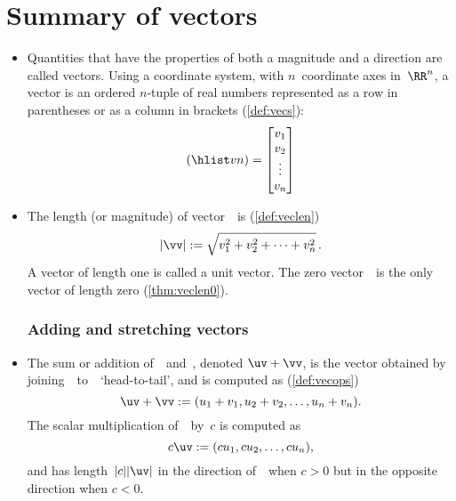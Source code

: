 
\section{Summary of vectors}
\label{sec:sumv}


\begin{itemize}
\def\index#1{}%

\subsubsection{Vectors have magnitude and direction}

\item Quantities that have the properties of both a magnitude and a direction are called {vectors}.  
Using a coordinate system, with \(n\)~coordinate axes in~\(\RR^n\), a {vector} is an ordered \(n\)-tuple of real numbers represented as a row in parentheses or as a column in brackets (\autoref{def:vecs}):
\begin{equation*}
(\hlist vn)=\begin{bmatrix} v_1\\v_2\\\vdots\\v_n \end{bmatrix}
\end{equation*}

\item  The {length} (or {magnitude}) of vector~\vv\  is  (\autoref{def:veclen})
\begin{equation*}
|\vv|:=\sqrt{v_1^2+v_2^2+\cdots+v_n^2}\,.
\end{equation*}
A vector of length one is called a {unit vector}.
The {zero vector}~\ov\ is the only vector of {length} zero (\autoref{thm:veclen0}).




\subsubsection{Adding and stretching vectors}

\item The {sum} or {addition} of~\uv\ and~\vv, denoted \(\uv+\vv\), is the vector obtained by joining~\vv\ to~\uv\ `head-to-tail', and is computed as (\autoref{def:vecops})
\begin{equation*}
\uv+\vv:=(u_1+v_1,u_2+v_2,\ldots,u_n+v_n).
\end{equation*}
The {scalar multiplication} of~\uv\ by~\(c\) is computed as
\begin{equation*}
c\uv:=(cu_1,cu_2,\ldots,cu_n),
\end{equation*}
and has length~\(|c||\uv|\) in the direction of~\uv\ when \(c>0\) but in the opposite direction when \(c<0\).


\end{itemize}
